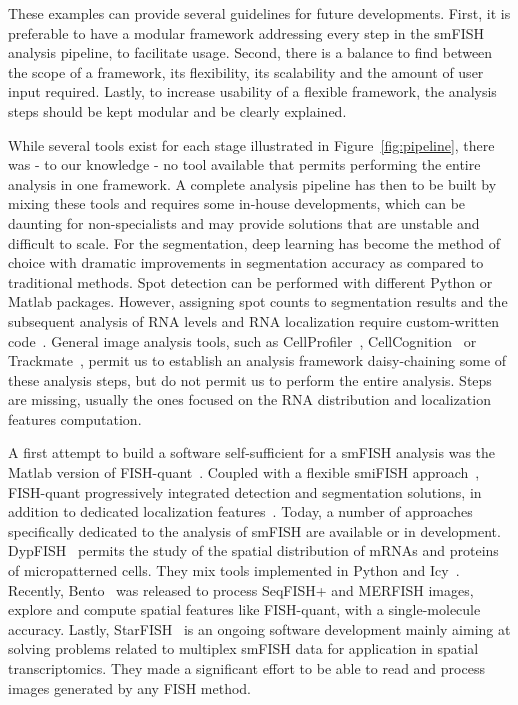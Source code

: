 These examples can provide several guidelines for future developments.
First, it is preferable to have a modular framework addressing every step in the \ac{smFISH} analysis pipeline, to facilitate usage.
Second, there is a balance to find between the scope of a framework, its flexibility, its scalability and the amount of user input required.
Lastly, to increase usability of a flexible framework, the analysis steps should be kept modular and be clearly explained.

While several tools exist for each stage illustrated in Figure~\ref{fig:pipeline}, there was - to our knowledge - no tool available that permits performing the entire analysis in one framework.
A complete analysis pipeline has then to be built by mixing these tools and requires some in-house developments, which can be daunting for non-specialists and may provide solutions that are unstable and difficult to scale.
For the segmentation, deep learning has become the method of choice with dramatic improvements in segmentation accuracy as compared to traditional methods.
Spot detection can be performed with different Python or Matlab packages.
However, assigning spot counts to segmentation results and the subsequent analysis of \ac{RNA} levels and RNA localization require custom-written code~\cite{stoeger_computer_2015, samacoits_computational_2018}.
General image analysis tools, such as CellProfiler~\cite{mcquin_cellprofiler_2018}, CellCognition~\cite{held_cellcognition_2010} or Trackmate~\cite{ershov_bringing_2021}, permit us to establish an analysis framework daisy-chaining some of these analysis steps, but do not permit us to perform the entire analysis.
Steps are missing, usually the ones focused on the \ac{RNA} distribution and localization features computation.

A first attempt to build a software self-sufficient for a \ac{smFISH} analysis was the Matlab version of FISH-quant~\cite{mueller_fish-quant_2013}.
Coupled with a flexible \ac{smiFISH} approach~\cite{tsanov_smifish_2016}, FISH-quant progressively integrated detection and segmentation solutions, in addition to dedicated localization features~\cite{samacoits_computational_2018}.
Today, a number of approaches specifically dedicated to the analysis of \ac{smFISH} are available or in development.
DypFISH~\cite{savulescu_dypfish_2019,savulescu_interrogating_2021} permits the study of the spatial distribution of \ac{mRNA}s and proteins of micropatterned cells.
They mix tools implemented in Python and Icy~\cite{de_chaumont_icy_2012}.
Recently, Bento~\cite{mah_bento_2022} was released to process \ac{SeqFISH}+ and \ac{MERFISH} images, explore and compute spatial features like FISH-quant, with a single-molecule accuracy.
Lastly, StarFISH~\cite{perkel_starfish_2019} is an ongoing software development mainly aiming at solving problems related to multiplex \ac{smFISH} data for application in spatial transcriptomics.
They made a significant effort to be able to read and process images generated by any \ac{FISH} method.

